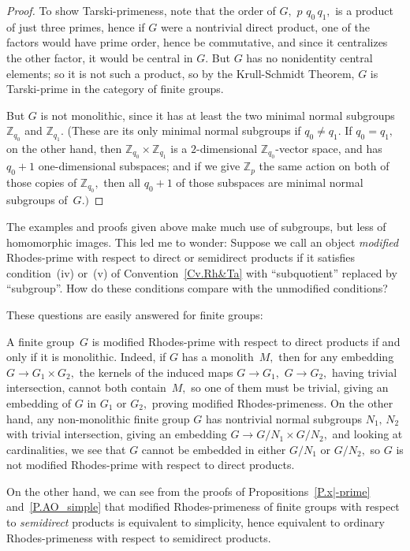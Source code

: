 \documentclass{amsart}
\numberwithin{equation}{section}
\numberwithin{theorem}{section}
\newcommand{\Z}{\mathbb{Z}}
\begin{document}
\begin{proof}
To show Tarski-primeness, note that
the order of $G,$ $p\,\,q_0\,q_1,$ is a product of just three
primes, hence if $G$ were a nontrivial direct product,
one of the factors would have prime
order, hence be commutative, and since it centralizes
the other factor, it would be central in $G.$
But $G$ has no nonidentity central elements; so
it is not such a product, so by the Krull-Schmidt Theorem,
$G$ is Tarski-prime in the category of finite groups.

But $G$ is not monolithic, since it has at least the two minimal
normal subgroups $\Z_{q_0}$ and $\Z_{q_1}.$
(These are its only minimal normal subgroups if $q_0\neq q_1.$
If $q_0=q_1,$ on the other hand, then $\Z_{q_0}\times\Z_{q_1}$ is a
$\!2\!$-dimensional $\Z_{q_0}\!$-vector space, and
has $q_0\!+\!1$ one-dimensional subspaces; and if we
give $\Z_p$ the same action on both of those
copies of $\Z_{q_0},$ then all $q_0\!+\!1$ of those subspaces
are minimal normal subgroups of~$G.)$
\end{proof}

The examples and proofs given above
make much use of subgroups,
but less of homomorphic images.
This led me to wonder:  Suppose we
call an object {\em modified} Rhodes-prime with
respect to direct  or semidirect products if it satisfies
condition~(iv) or~(v) of Convention~\ref{Cv.Rh&Ta} with
``subquotient'' replaced by ``subgroup''.
How do these conditions compare with the unmodified conditions?

These questions are easily answered for finite groups:

A finite group~$G$ is modified Rhodes-prime
with respect to direct products if and only if it is monolithic.
Indeed, if $G$ has a monolith~$M,$ then
for any embedding $G\to G_1\times G_2,$ the kernels of the induced maps
$G\to G_1,$ $G\to G_2,$ having trivial intersection,
cannot both contain~$M,$ so one of them must be trivial,
giving an embedding of $G$ in $G_1$ or $G_2,$
proving modified Rhodes-primeness.
On the other hand, any non-monolithic finite group $G$
has nontrivial normal subgroups
$N_1,\,N_2$ with trivial intersection, giving
an embedding $G\to G/N_1\times G/N_2,$
and looking at cardinalities, we see that $G$ cannot
be embedded in either $G/N_1$ or $G/N_2,$ so $G$
is not modified Rhodes-prime with respect to direct products.

On the other hand, we can see from the proofs of
Propositions~\ref{P.x|-prime} and~\ref{P.AO_simple} that modified
Rhodes-primeness of finite groups with respect to
{\em semidirect} products is equivalent to simplicity,
hence equivalent to ordinary Rhodes-primeness with respect to
semidirect products.
\end{document}
